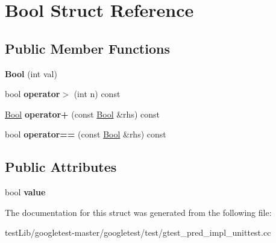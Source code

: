\hypertarget{structBool}{}\section{Bool Struct Reference}
\label{structBool}
\subsection*{Public Member Functions}
\begin{DoxyCompactItemize}
\item 
\mbox{\label{structBool_a03dfd4851b13abb29414887fcada7fca}} 
{\bfseries Bool} (int val)
\item 
\mbox{\label{structBool_a7baecbc58992eb06157fbbbaa560be0b}} 
bool {\bfseries operator$>$} (int n) const
\item 
\mbox{\label{structBool_a6f4ecdec19082e896cffce66e6b6e7cc}} 
\hyperlink{structBool}{Bool} {\bfseries operator+} (const \hyperlink{structBool}{Bool} \&rhs) const
\item 
\mbox{\label{structBool_afe799a4977c5ebe4c215d5d4ebd77adb}} 
bool {\bfseries operator==} (const \hyperlink{structBool}{Bool} \&rhs) const
\end{DoxyCompactItemize}
\subsection*{Public Attributes}
\begin{DoxyCompactItemize}
\item 
\mbox{\label{structBool_a16be863c269f988cdcbe59f9d846a141}} 
bool {\bfseries value}
\end{DoxyCompactItemize}


The documentation for this struct was generated from the following file\+:\begin{DoxyCompactItemize}
\item 
test\+Lib/googletest-\/master/googletest/test/gtest\+\_\+pred\+\_\+impl\+\_\+unittest.\+cc\end{DoxyCompactItemize}
